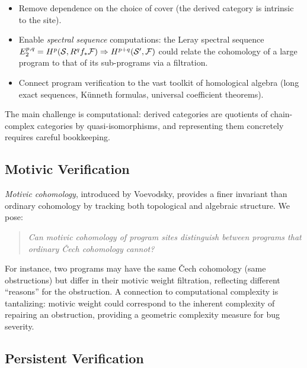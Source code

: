 \begin{itemize}[leftmargin=1.5em]
  \item Remove dependence on the choice of cover (the derived category
    is intrinsic to the site).
  \item Enable \emph{spectral sequence} computations: the Leray spectral
    sequence $E_2^{p,q} = H^{p}(\mathcal{S}, R^q f_* \mathcal{F})
    \Rightarrow H^{p+q}(\mathcal{S}', \mathcal{F})$ could relate the
    cohomology of a large program to that of its sub-programs via a
    filtration.
  \item Connect program verification to the vast toolkit of homological
    algebra (\eg long exact sequences, K\"unneth formulas, universal
    coefficient theorems).
\end{itemize}

\noindent
The main challenge is computational: derived categories are quotients of
chain-complex categories by quasi-isomorphisms, and representing them
concretely requires careful bookkeeping.

\subsection{Motivic Verification}\label{sec:future-motivic}

\emph{Motivic cohomology}, introduced by Voevodsky, provides a finer
invariant than ordinary cohomology by tracking both topological and
algebraic structure.  We pose:

\begin{quote}
\emph{Can motivic cohomology of program sites distinguish between
programs that ordinary \v{C}ech cohomology cannot?}
\end{quote}

For instance, two programs may have the same \v{C}ech cohomology
(same obstructions) but differ in their motivic weight filtration,
reflecting different ``reasons'' for the obstruction.  A connection
to computational complexity is tantalizing: motivic weight could
correspond to the inherent complexity of repairing an obstruction,
providing a geometric complexity measure for bug severity.

\subsection{Persistent Verification}\label{sec:future-persistent}

